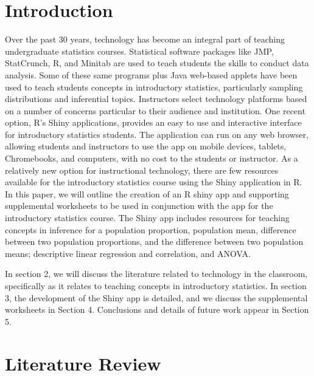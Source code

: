 \documentclass[11pt]{book}
\begin{document}
\section{Introduction}
Over the past 30 years, technology has become an integral part of teaching undergraduate statistics courses. Statistical software packages like JMP, StatCrunch, R, and Minitab are used to teach students the skills to conduct data analysis. Some of these same programs plus Java web-based applets have been used to teach students concepts in introductory statistics, particularly sampling distributions and inferential topics. Instructors select technology platforms based on a number of concerns particular to their audience and institution. One recent option, R's Shiny applications, provides an easy to use and interactive interface for introductory statistics students. The application can run on any web browser, allowing students and instructors to use the app on mobile devices, tablets, Chromebooks, and computers, with no cost to the students or instructor. As a relatively new option for instructional technology, there are few resources available for the introductory statistics course using the Shiny application in R. In this paper, we will outline the creation of an R shiny app and supporting supplemental worksheets to be used in conjunction with the app for the introductory statistics course. The Shiny app includes resources for teaching concepts in inference for a population proportion, population mean, difference between two population proportions, and the difference between two population means; descriptive linear regression and correlation, and ANOVA.

In section 2, we will discuss the literature related to technology in the classroom, specifically as it relates to teaching concepts in introductory statistics. In section 3, the development of the Shiny app is detailed, and we discuss the supplemental worksheets in Section 4. Conclusions and details of future work appear in Section 5.
 
\section{Literature Review}
	   	
\end{document}
